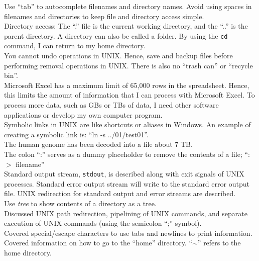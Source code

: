 Use ``tab'' to autocomplete filenames and directory names. Avoid using spaces in filenames and directories to keep file and directory access simple. \\

Directory access: The ``.'' file is the current working directory, and the ``..'' is the parent directory. A directory can also be called a folder. By using the {\tt cd} command, I can return to my home directory. \\

You cannot undo operations in UNIX. Hence, save and backup files before performing removal operations in UNIX. There is also no ``trash can'' or ``recycle bin''. \\

Microsoft Excel has a maximum limit of 65,000 rows in the spreadsheet. Hence, this limits the amount of information that I can process with Microsoft Excel. To process more data, such as GBs or TBs of data, I need other software applications or develop my own computer program. \\ 

Symbolic links in UNIX are like shortcuts or aliases in Windows. An example of creating a symbolic link is: ``ln -s ../01/test01''. \\

The human genome has been decoded into a file about 7 TB. \\

The colon ``:'' serves as a dummy placeholder to remove the contents of a file; ``: $>$ filename'' \\

Standard output stream, {\tt stdout}, is described along with exit signals of UNIX processes. Standard error output stream will write to the standard error output file. UNIX redirection for standard output and error streams are described. \\

Use {\it tree} to show contents of a directory as a tree. \\

Discussed UNIX path redirection, pipelining of UNIX commands, and separate execution of UNIX commands (using the semicolon ``;'' symbol). \\

Covered special/escape characters to use tabs and newlines to print information. \\

Covered information on how to go to the ``home'' directory. ``$\sim$'' refers to the home directory. \\


